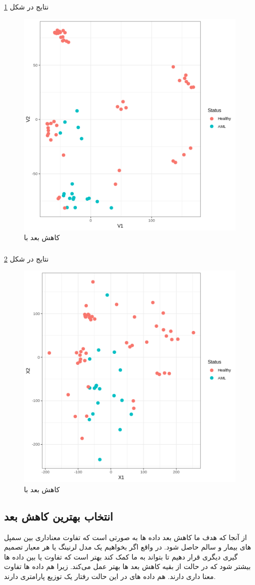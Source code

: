 \documentclass{article}
\begin{document}
\subsubsection{}
نتایج در شکل \ref{fig:mds}
\begin{figure}[h!]
	\centering
	\includegraphics[width=0.5\columnwidth]{figs/mds.png}
	\caption{کاهش بعد با }
	\label{fig:mds}
\end{figure}
\subsubsection{}
نتایج در شکل  \ref{fig:sammon}
\begin{figure}[h!]
	\centering
	\includegraphics[width=0.5\columnwidth]{figs/sammon.png}
	\caption{کاهش بعد با }
	\label{fig:sammon}
\end{figure}
\subsection{انتخاب بهترین کاهش بعد}
از آنجا که هدف ما کاهش بعد داده ها به صورتی است که تفاوت معناداری بین سمپل های بیمار و سالم حاصل شود.
در واقع اگر بخواهیم یک مدل لرنینگ یا هر معیار تصمیم گیری دیگری قرار دهیم تا بتواند به ما کمک کند بهتر است که تفاوت یا  بین داده ها بیشتر شود که در حالت   از بقیه کاهش بعد ها بهتر عمل می‌کند.
زیرا هم داده ها تفاوت معنا داری دارند.
هم داده های 
در این حالت رفتار یک توزیع پارامتری دارند.
\end{document}
